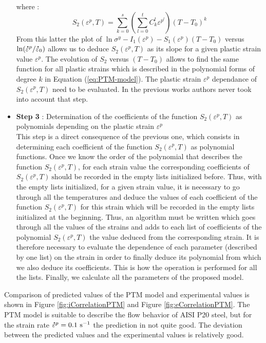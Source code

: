 \documentclass[twoside,english,1p,final,sort&compress]{elsarticle}
\theoremstyle{plain}
\newcommand{\mdot}[1]{\accentset{\mbox{\bfseries .}}{#1}}
\begin{document}
\begin{itemize}
where :
\begin{equation}
S_2 (\varepsilon^p,T)= \sum_{k=0}^{s}\left(\sum_{l=0}^{t}{C_k^l\varepsilon^{p^l}} \right)\left(T-T_0\right)^k
\label{eq:S2_coefs}
\end{equation}
From this latter the plot of $\ln \sigma^y - I_1(\varepsilon^p) - S_1(\varepsilon^p)\left(T-T_0\right)$ versus $\ln(\mdot{\varepsilon}^p/\mdot{\varepsilon}_0)$ allows us to deduce $S_2(\varepsilon^p,T)$ as its slope for a given plastic strain value $\varepsilon^p$. The evolution of $S_2$ versus $\left(T-T_0\right)$ allows to find the same function for all plastic strains which is described in the polynomial forms of degree $k$ in Equation (\ref{eq:PTM-model}). The plastic strain $\varepsilon^p$ dependance of $S_2(\varepsilon^p,T)$ need to be evaluated. In the previous works \cite{Gao-2020-FBC, Yu-2020-FSM, Gurusamy-2017-PMZA, Samantaray-2009-CSJC, He-2014-MZA, Zhan-2014-CMF, Gupta-2013-CMP, Samantaray-2011-AMM} authors never took into account that step.
\item \textbf{Step 3} : Determination of the coefficients of the function $S_2(\varepsilon^p,T)$ as polynomials depending on the plastic strain $\varepsilon^p$\\
This step is a direct consequence of the previous one, which consists in determining each coefficient of the function $S_2(\varepsilon^p,T)$ as polynomial functions. Once we know the order of the polynomial that describes the function $S_2(\varepsilon^p,T)$, for each strain value the corresponding coefficients of  $S_2(\varepsilon^p,T)~\text{s}$hould be recorded in the empty lists initialized before. Thus, with the empty lists initialized, for a given strain value, it is necessary to go through all the temperatures and deduce the values of each coefficient of the function $S_2(\varepsilon^p,T)$ for this strain which will be recorded in the empty lists initialized at the beginning. Thus, an algorithm must be written which goes through all the values of the strains and adds to each list of coefficients of the polynomial $S_2(\varepsilon^p,T)$ the value deduced from the corresponding strain. It is therefore necessary to evaluate the dependence of each parameter (described by one list) on the strain in order to finally deduce its polynomial from which we also deduce its coefficients. This is how the operation is performed for all the lists. Finally, we calculate all the parameters of the proposed model. 
\end{itemize}
Comparison of predicted values of the PTM model and experimental values is shown in Figure \ref{fig:iCorrelationPTM} and Figure \ref{fig:eCorrelationPTM}. The PTM model is suitable to describe the ﬂow behavior of AISI P20 steel, but for the strain rate $\mdot{\varepsilon}^p = 0.1\ \text{s}^{-1}$ the prediction in not quite good. The deviation between the predicted values and the experimental values is relatively good.
\end{document}
